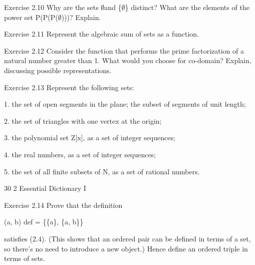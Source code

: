 \documentclass[11pt]{article}
\theoremstyle{plain}
\theoremstyle{definition}
\begin{document}
Exercise 2.10 Why are the sets $\emptyset$and \{$\emptyset$\} distinct? What are the elements of the power set P(P(P($\emptyset$)))? Explain.

Exercise 2.11 Represent the algebraic sum of sets as a function.

Exercise 2.12 Consider the function that performs the prime factorization of a natural number greater than 1. What would you choose for co-domain? Explain, discussing possible representations.

Exercise 2.13 Represent the following sets:

1. the set of open segments in the plane; the subset of segments of unit length;

2. the set of triangles with one vertex at the origin;

3. the polynomial set Z[x], as a set of integer sequences;

4. the real numbers, as a set of integer sequences;

5. the set of all finite subsets of N, as a set of rational numbers.

30 2 Essential Dictionary I

Exercise 2.14 Prove that the definition

(a, b) def = \{\{a\}, \{a, b\}\}

satisfies (2.4). (This shows that an ordered pair can be defined in terms of a set, so there's no need to introduce a new object.) Hence define an ordered triple in terms of sets.
\end{document}
